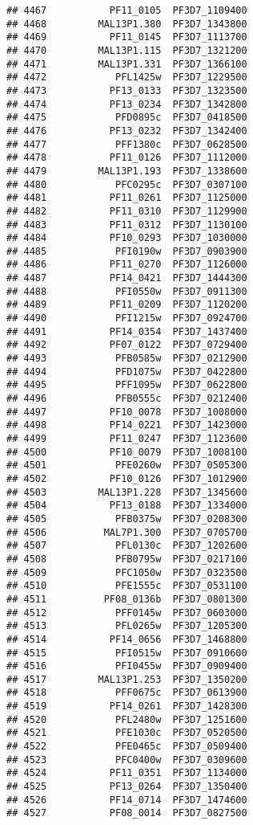 \documentclass{article}\usepackage[]{graphicx}\usepackage[]{color}
\makeatletter
\newenvironment{kframe}{%
 \def\at@end@of@kframe{}%
 \ifinner\ifhmode%
  \def\at@end@of@kframe{\end{minipage}}%
  \begin{minipage}{\columnwidth}%
 \fi\fi%
 \def\FrameCommand##1{\hskip\@totalleftmargin \hskip-\fboxsep
 \colorbox{shadecolor}{##1}\hskip-\fboxsep
     \hskip-\linewidth \hskip-\@totalleftmargin \hskip\columnwidth}%
 \MakeFramed {\advance\hsize-\width
   \@totalleftmargin\z@ \linewidth\hsize
   \@setminipage}}%
 {\par\unskip\endMakeFramed%
 \at@end@of@kframe}
\newenvironment{knitrout}{}{} %
\makeatother
\begin{document}
\begin{knitrout}
\begin{kframe}
\begin{verbatim}
## 4467           PF11_0105  PF3D7_1109400
## 4468         MAL13P1.380  PF3D7_1343800
## 4469           PF11_0145  PF3D7_1113700
## 4470         MAL13P1.115  PF3D7_1321200
## 4471         MAL13P1.331  PF3D7_1366100
## 4472            PFL1425w  PF3D7_1229500
## 4473           PF13_0133  PF3D7_1323500
## 4474           PF13_0234  PF3D7_1342800
## 4475            PFD0895c  PF3D7_0418500
## 4476           PF13_0232  PF3D7_1342400
## 4477            PFF1380c  PF3D7_0628500
## 4478           PF11_0126  PF3D7_1112000
## 4479         MAL13P1.193  PF3D7_1338600
## 4480            PFC0295c  PF3D7_0307100
## 4481           PF11_0261  PF3D7_1125000
## 4482           PF11_0310  PF3D7_1129900
## 4483           PF11_0312  PF3D7_1130100
## 4484           PF10_0293  PF3D7_1030000
## 4485            PFI0190w  PF3D7_0903900
## 4486           PF11_0270  PF3D7_1126000
## 4487           PF14_0421  PF3D7_1444300
## 4488            PFI0550w  PF3D7_0911300
## 4489           PF11_0209  PF3D7_1120200
## 4490            PFI1215w  PF3D7_0924700
## 4491           PF14_0354  PF3D7_1437400
## 4492           PF07_0122  PF3D7_0729400
## 4493            PFB0585w  PF3D7_0212900
## 4494            PFD1075w  PF3D7_0422800
## 4495            PFF1095w  PF3D7_0622800
## 4496            PFB0555c  PF3D7_0212400
## 4497           PF10_0078  PF3D7_1008000
## 4498           PF14_0221  PF3D7_1423000
## 4499           PF11_0247  PF3D7_1123600
## 4500           PF10_0079  PF3D7_1008100
## 4501            PFE0260w  PF3D7_0505300
## 4502           PF10_0126  PF3D7_1012900
## 4503         MAL13P1.228  PF3D7_1345600
## 4504           PF13_0188  PF3D7_1334000
## 4505            PFB0375w  PF3D7_0208300
## 4506          MAL7P1.300  PF3D7_0705700
## 4507            PFL0130c  PF3D7_1202600
## 4508            PFB0795w  PF3D7_0217100
## 4509            PFC1050w  PF3D7_0323500
## 4510            PFE1555c  PF3D7_0531100
## 4511          PF08_0136b  PF3D7_0801300
## 4512            PFF0145w  PF3D7_0603000
## 4513            PFL0265w  PF3D7_1205300
## 4514           PF14_0656  PF3D7_1468800
## 4515            PFI0515w  PF3D7_0910600
## 4516            PFI0455w  PF3D7_0909400
## 4517         MAL13P1.253  PF3D7_1350200
## 4518            PFF0675c  PF3D7_0613900
## 4519           PF14_0261  PF3D7_1428300
## 4520            PFL2480w  PF3D7_1251600
## 4521            PFE1030c  PF3D7_0520500
## 4522            PFE0465c  PF3D7_0509400
## 4523            PFC0400w  PF3D7_0309600
## 4524           PF11_0351  PF3D7_1134000
## 4525           PF13_0264  PF3D7_1350400
## 4526           PF14_0714  PF3D7_1474600
## 4527           PF08_0014  PF3D7_0827500

\end{verbatim}
\end{kframe}
\end{knitrout}
\end{document}
